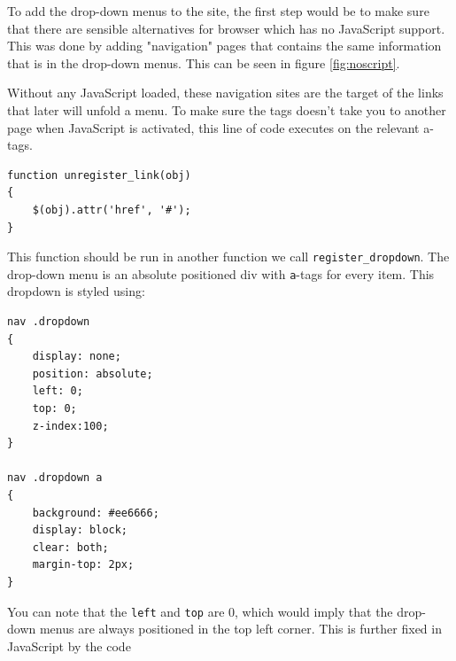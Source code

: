 \documentclass[a4paper]{scrartcl}
\begin{document}
To add the drop-down menus to the site, the first step would be to make sure that there are sensible alternatives for browser which has no JavaScript support. This was done by adding "navigation" pages that contains the same information that is in the drop-down menus. This can be seen in figure \ref{fig:noscript}.

Without any JavaScript loaded, these navigation sites are the target of the links that later will unfold a menu. To make sure the tags doesn't take you to another page when JavaScript is activated, this line of code executes on the relevant a-tags.
 
\begin{lstlisting}
function unregister_link(obj)
{
    $(obj).attr('href', '#');
}
\end{lstlisting}

This function should be run in another function we call \texttt{register\_dropdown}. The drop-down menu is an absolute positioned div with \texttt{a}-tags for every item. This dropdown is styled using:

\begin{lstlisting}
nav .dropdown                                                                   
{                                                                               
    display: none;                                                              
    position: absolute;                                                         
    left: 0;                                                                    
    top: 0;                                                                     
    z-index:100;                                                                
}                                                                               
                                                                                
nav .dropdown a                                                                 
{                                                                               
    background: #ee6666;                                                        
    display: block;                                                             
    clear: both;                                                                
    margin-top: 2px;                                                            
}  
\end{lstlisting}

You can note that the \texttt{left} and \texttt{top} are 0, which would imply that the drop-down menus are always positioned in the top left corner. This is further fixed in JavaScript by the code
\end{document}

